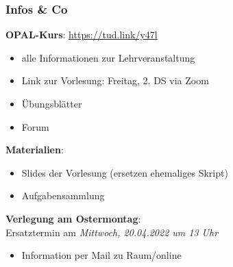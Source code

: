 \documentclass{beamer}
\begin{document}
	\begin{frame}\frametitle{Infos \& Co}		
		\textbf{OPAL-Kurs}: 
		\url{https://tud.link/y47l}
		
		\begin{itemize}
			\item alle Informationen zur Lehrveranstaltung
			\item Link zur Vorlesung: Freitag, 2. DS via Zoom
			\item Übungsblätter
			\item Forum
		\end{itemize}
		
		\textbf{Materialien}: 
		\begin{itemize}
			\item Slides der Vorlesung (ersetzen ehemaliges Skript)
			\item Aufgabensammlung
		\end{itemize}
		
		
		\textbf{Verlegung am Ostermontag}: \\
		Ersatztermin am \textit{Mittwoch, 20.04.2022 um 13 Uhr}
		\begin{itemize}
			\item Information per Mail zu Raum/online
		\end{itemize}
	\end{frame}
	
	
%		
%		
%		
\end{document}
